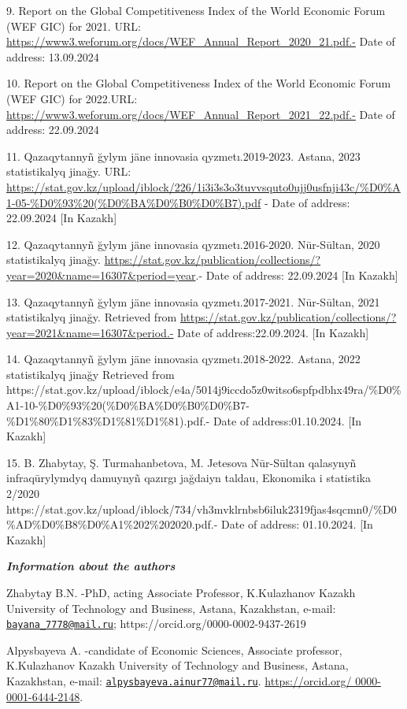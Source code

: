 {{9. Report on the Global Competitiveness Index of the World Economic
Forum (WEF GIC) for 2021. URL:
\url{https://www3.weforum.org/docs/WEF_Annual_Report_2020_21.pdf.-} Date
of address: 13.09.2024

10. Report on the Global Competitiveness Index of the World Economic
Forum (WEF GIC) for 2022.URL:
\url{https://www3.weforum.org/docs/WEF_Annual_Report_2021_22.pdf.-} Date
of address: 22.09.2024

11. Qazaqytannyñ ğylym jäne innovasia qyzmetı.2019-2023. Astana, 2023
statistikalyq jinağy. URL:
\url{https://stat.gov.kz/upload/iblock/226/1i3i3s3o3tuvvsquto0ujj0usfnji43c/\%D0\%A1-05-\%D0\%93\%20(\%D0\%BA\%D0\%B0\%D0\%B7).pdf}
- Date of address: 22.09.2024 {[}In Kazakh{]}

12. Qazaqytannyñ ğylym jäne innovasia qyzmetı.2016-2020. Nūr-Sūltan,
2020 statistikalyq jinağy.
\url{https://stat.gov.kz/publication/collections/?year=2020&name=16307&period=year}.-
Date of address: 22.09.2024 {[}In Kazakh{]}

13. Qazaqytannyñ ğylym jäne innovasia qyzmetı.2017-2021. Nūr-Sūltan,
2021 statistikalyq jinağy. Retrieved from
\url{https://stat.gov.kz/publication/collections/?year=2021&name=16307&period.-}
Date of address:22.09.2024. {[}In Kazakh{]}

14. Qazaqytannyñ ğylym jäne innovasia qyzmetı.2018-2022. Astana, 2022
statistikalyq jinağy Retrieved from
https://stat.gov.kz/upload/iblock/e4a/5014j9iccdo5z0witso6spfpdbhx49ra/\%D0\%A1-10-\%D0\%93\%20(\%D0\%BA\%D0\%B0\%D0\%B7-\%D1\%80\%D1\%83\%D1\%81\%D1\%81).pdf.-
Date of address:01.10.2024. {[}In Kazakh{]}

15. B. Zhabytay, Ş. Turmahanbetova, M. Jetesova Nūr-Sūltan qalasynyñ
infraqūrylymdyq damuynyñ qazırgı jağdaiyn taldau, Ekonomika i statistika
2/2020
https://stat.gov.kz/upload/iblock/734/vh3mvklrnbsb6iluk2319fjas4sqcmn0/\%D0\%AD\%D0\%B8\%D0\%A1\%202\%202020.pdf.-
Date of address: 01.10.2024. {[}In Kazakh{]}

\emph{{\bfseries Information about the authors}}

Zhabytaу B.N. -PhD, acting Associate Professor, K.Kulazhanov Kazakh
University of Technology and Business, Astana, Kazakhstan, e-mail:
\href{mailto:bayana_7778@mail.ru}{\nolinkurl{bayana\_7778@mail.ru}};
https://orcid.org/0000-0002-9437-2619

Alpysbayeva A. -candidate of Economic Sciences, Аssociate professor,
K.Kulazhanov Kazakh University of Technology and Business, Astana,
Kazakhstan, e-mail:
\href{mailto:alpysbayeva.ainur77@mail.ru}{\nolinkurl{alpysbayeva.ainur77@mail.ru}}.
\href{https://orcid.org/\%200000-0001-6444-2148}{https://orcid.org/
0000-0001-6444-2148}.

}}
